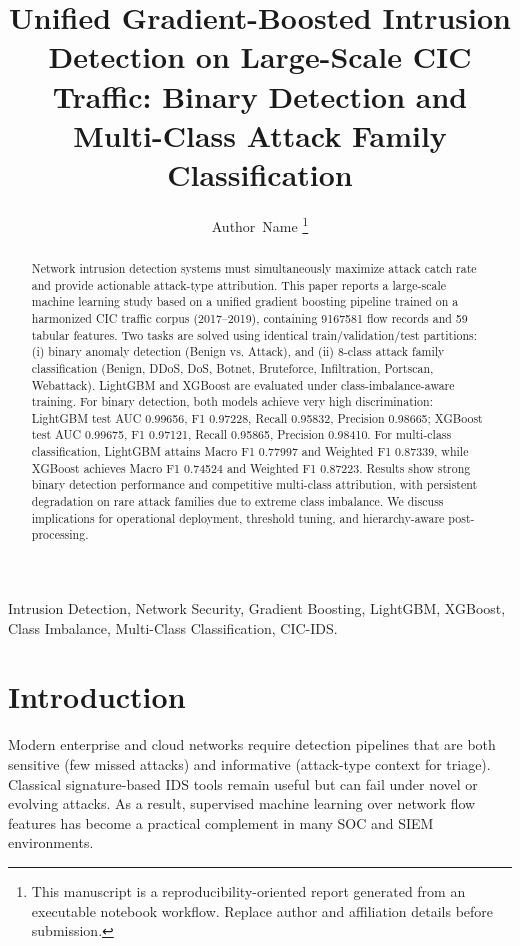 \documentclass[10pt,journal]{IEEEtran}
\title{Unified Gradient-Boosted Intrusion Detection on Large-Scale CIC Traffic: Binary Detection and Multi-Class Attack Family Classification}
\author{Author~Name
\thanks{This manuscript is a reproducibility-oriented report generated from an executable notebook workflow. Replace author and affiliation details before submission.}}
\begin{document}
\maketitle

\begin{abstract}
Network intrusion detection systems must simultaneously maximize attack catch rate and provide actionable attack-type attribution. This paper reports a large-scale machine learning study based on a unified gradient boosting pipeline trained on a harmonized CIC traffic corpus (2017--2019), containing \num{9167581} flow records and 59 tabular features. Two tasks are solved using identical train/validation/test partitions: (i) binary anomaly detection (Benign vs. Attack), and (ii) 8-class attack family classification (Benign, DDoS, DoS, Botnet, Bruteforce, Infiltration, Portscan, Webattack). LightGBM and XGBoost are evaluated under class-imbalance-aware training. For binary detection, both models achieve very high discrimination: LightGBM test AUC \num{0.99656}, F1 \num{0.97228}, Recall \num{0.95832}, Precision \num{0.98665}; XGBoost test AUC \num{0.99675}, F1 \num{0.97121}, Recall \num{0.95865}, Precision \num{0.98410}. For multi-class classification, LightGBM attains Macro F1 \num{0.77997} and Weighted F1 \num{0.87339}, while XGBoost achieves Macro F1 \num{0.74524} and Weighted F1 \num{0.87223}. Results show strong binary detection performance and competitive multi-class attribution, with persistent degradation on rare attack families due to extreme class imbalance. We discuss implications for operational deployment, threshold tuning, and hierarchy-aware post-processing.
\end{abstract}

\begin{IEEEkeywords}
Intrusion Detection, Network Security, Gradient Boosting, LightGBM, XGBoost, Class Imbalance, Multi-Class Classification, CIC-IDS.
\end{IEEEkeywords}

\section{Introduction}
Modern enterprise and cloud networks require detection pipelines that are both sensitive (few missed attacks) and informative (attack-type context for triage). Classical signature-based IDS tools remain useful but can fail under novel or evolving attacks. As a result, supervised machine learning over network flow features has become a practical complement in many SOC and SIEM environments.
\end{document}
